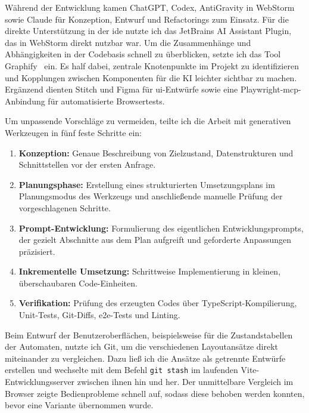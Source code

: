 

Während der Entwicklung kamen ChatGPT, Codex, AntiGravity in WebStorm sowie Claude für Konzeption, Entwurf und Refactorings zum Einsatz. Für die direkte Unterstützung in der \gls{ide} nutzte ich das JetBrains AI Assistant Plugin, das in WebStorm direkt nutzbar war. Um die Zusammenhänge und Abhängigkeiten in der Codebasis schnell zu überblicken, setzte ich das Tool Graphify~\cite{shamsi2026graphify} ein. Es half dabei, zentrale Knotenpunkte im Projekt zu identifizieren und Kopplungen zwischen Komponenten für die KI leichter sichtbar zu machen. Ergänzend dienten Stitch und Figma für \gls{ui}-Entwürfe sowie eine Playwright-\gls{mcp}-Anbindung für automatisierte Browsertests.

Um unpassende Vorschläge zu vermeiden, teilte ich die Arbeit mit generativen Werkzeugen in fünf feste Schritte ein:
\begin{enumerate}
  \item \textbf{Konzeption:} Genaue Beschreibung von Zielzustand, Datenstrukturen und Schnittstellen vor der ersten Anfrage.
  \item \textbf{Planungsphase:} Erstellung eines strukturierten Umsetzungsplans im Planungsmodus des Werkzeugs und anschließende manuelle Prüfung der vorgeschlagenen Schritte.
  \item \textbf{Prompt-Entwicklung:} Formulierung des eigentlichen Entwicklungsprompts, der gezielt Abschnitte aus dem Plan aufgreift und geforderte Anpassungen präzisiert.
  \item \textbf{Inkrementelle Umsetzung:} Schrittweise Implementierung in kleinen, überschaubaren Code-Einheiten.
  \item \textbf{Verifikation:} Prüfung des erzeugten Codes über TypeScript-Kompilierung, Unit-Tests, Git-Diffs, \gls{e2e}-Tests und Linting.
\end{enumerate}

Beim Entwurf der Benutzeroberflächen, beispielsweise für die Zustandstabellen der Automaten, nutzte ich Git, um die verschiedenen Layoutansätze direkt miteinander zu vergleichen. Dazu ließ ich die Ansätze als getrennte Entwürfe erstellen und wechselte mit dem Befehl \texttt{git stash} im laufenden Vite-Entwicklungsserver zwischen ihnen hin und her. Der unmittelbare Vergleich im Browser zeigte Bedienprobleme schnell auf, sodass diese behoben werden konnten, bevor eine Variante übernommen wurde.

